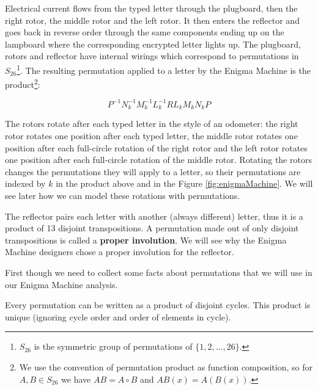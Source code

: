 Electrical current flows from the typed letter through the plugboard, then the right rotor, the middle rotor and the left rotor. It then enters the reflector and goes back in reverse order through the same components ending up on the lampboard where the corresponding encrypted letter lights up. The plugboard, rotors and reflector have internal wirings which correspond to permutations in $S_{26}$\footnote{$S_{26}$ is the symmetric group of permutations of $\{1, 2, \ldots, 26\}$.}. The resulting permutation applied to a letter by the Enigma Machine is the product\footnote{We use the convention of permutation product as function composition, so for $A,B \in S_{26}$ we have $AB=A \circ B$ and $AB(x)=A(B(x))$.}:

$$
P^{-1} N_k^{-1} M_k^{-1} L_k^{-1} R L_k M_k N_k P
$$

The rotors rotate after each typed letter in the style of an odometer: the right rotor rotates one position after each typed letter, the middle rotor rotates one position after each full-circle rotation of the right rotor and the left rotor rotates one position after each full-circle rotation of the middle rotor. Rotating the rotors changes the permutations they will apply to a letter, so their permutations are indexed by $k$ in the product above and in the Figure \ref{fig:enigmaMachine}. We will see later how we can model these rotations with permutations.

The reflector pairs each letter with another (always different) letter, thus it is a product of 13 disjoint transpositions. A permutation made out of only disjoint transpositions is called a \textbf{proper involution}. We will see why the Enigma Machine designers chose a proper involution for the reflector. 

First though we need to collect some facts about permutations that we will use in our Enigma Machine analysis.

\begin{thm}\label{cycleDecomposition}
Every permutation can be written as a product of disjoint cycles. This product is unique (ignoring cycle order and order of elements in cycle).
\end{thm}

